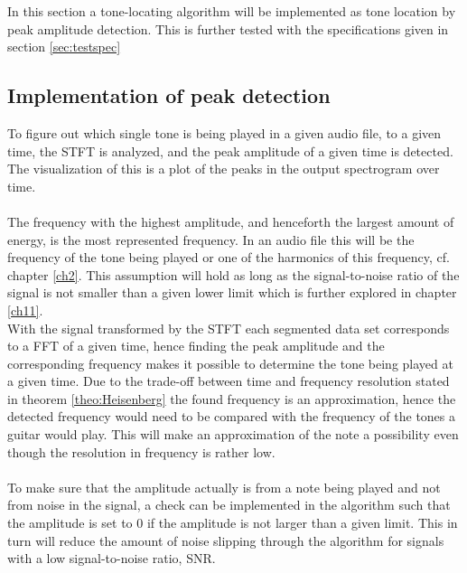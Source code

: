 \label{sec:peak_detection}
In this section a tone-locating algorithm will be implemented as tone location by peak amplitude detection.
This is further tested with the specifications given in section \ref{sec:testspec}
\subsection{Implementation of peak detection}
To figure out which single tone is being played in a given audio file, to a given time, the STFT is analyzed, and the peak amplitude of a given time is detected.
The visualization of this is a plot of the peaks in the output spectrogram over time.\\
\\
The frequency with the highest amplitude, and henceforth the largest amount of energy, is the most represented frequency. 
In an audio file this will be the frequency of the tone being played or one of the harmonics of this frequency, cf. chapter \ref{ch2}.
This assumption will hold as long as the signal-to-noise ratio of the signal is not smaller than a given lower limit which is further explored in chapter \ref{ch11}.\\
With the signal transformed by the STFT each segmented data set corresponds to a FFT of a given time, hence finding the peak amplitude and the corresponding frequency makes it possible to determine the tone being played at a given time. Due to the trade-off between time and frequency resolution stated in theorem \ref{theo:Heisenberg} the found frequency is an approximation, hence the detected frequency would need to be compared with the frequency of the tones a guitar would play. 
This will make an approximation of the note a possibility even though the resolution in frequency is rather low. \\
\\
To make sure that the amplitude actually is from a note being played and not from noise in the signal, a check can be implemented in the algorithm such that the amplitude is set to $0$ if the amplitude is not larger than a given limit.
This in turn will reduce the amount of noise slipping through the algorithm for signals with a low signal-to-noise ratio, SNR.


